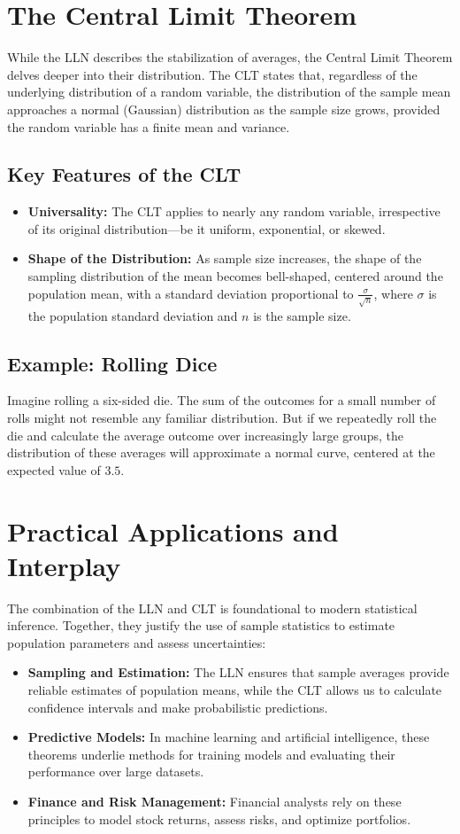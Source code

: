 \section*{The Central Limit Theorem}
While the LLN describes the stabilization of averages, the Central Limit Theorem delves deeper into their distribution. The CLT states that, regardless of the underlying distribution of a random variable, the distribution of the sample mean approaches a normal (Gaussian) distribution as the sample size grows, provided the random variable has a finite mean and variance.

\subsection*{Key Features of the CLT}
\begin{itemize}
    \item \textbf{Universality:} The CLT applies to nearly any random variable, irrespective of its original distribution---be it uniform, exponential, or skewed.
    \item \textbf{Shape of the Distribution:} As sample size increases, the shape of the sampling distribution of the mean becomes bell-shaped, centered around the population mean, with a standard deviation proportional to $\frac{\sigma}{\sqrt{n}}$, where $\sigma$ is the population standard deviation and $n$ is the sample size.
\end{itemize}

\subsection*{Example: Rolling Dice}
Imagine rolling a six-sided die. The sum of the outcomes for a small number of rolls might not resemble any familiar distribution. But if we repeatedly roll the die and calculate the average outcome over increasingly large groups, the distribution of these averages will approximate a normal curve, centered at the expected value of $3.5$.

\section*{Practical Applications and Interplay}
The combination of the LLN and CLT is foundational to modern statistical inference. Together, they justify the use of sample statistics to estimate population parameters and assess uncertainties:

\begin{itemize}
    \item \textbf{Sampling and Estimation:} The LLN ensures that sample averages provide reliable estimates of population means, while the CLT allows us to calculate confidence intervals and make probabilistic predictions.
    \item \textbf{Predictive Models:} In machine learning and artificial intelligence, these theorems underlie methods for training models and evaluating their performance over large datasets.
    \item \textbf{Finance and Risk Management:} Financial analysts rely on these principles to model stock returns, assess risks, and optimize portfolios.
\end{itemize}

